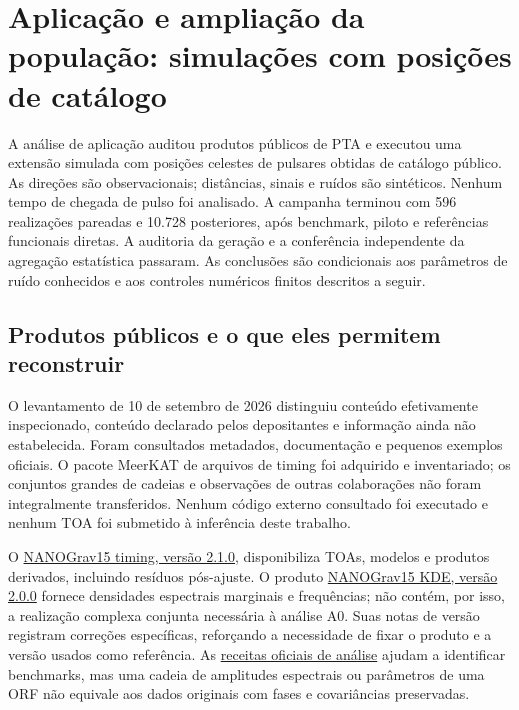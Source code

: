\chapter{Aplicação e ampliação da população: simulações com posições de catálogo}
\label{cap:c11-parcial}

A análise de aplicação auditou produtos públicos de PTA e executou uma extensão simulada com posições celestes de pulsares obtidas de catálogo público. As direções são observacionais; distâncias, sinais e ruídos são sintéticos. Nenhum tempo de chegada de pulso foi analisado. A campanha terminou com 596 realizações pareadas e 10.728 posteriores, após benchmark, piloto e referências funcionais diretas. A auditoria da geração e a conferência independente da agregação estatística passaram. As conclusões são condicionais aos parâmetros de ruído conhecidos e aos controles numéricos finitos descritos a seguir.

\section{Produtos públicos e o que eles permitem reconstruir}

O levantamento de 10 de setembro de 2026 distinguiu conteúdo efetivamente inspecionado, conteúdo declarado pelos depositantes e informação ainda não estabelecida. Foram consultados metadados, documentação e pequenos exemplos oficiais. O pacote MeerKAT de arquivos de timing foi adquirido e inventariado; os conjuntos grandes de cadeias e observações de outras colaborações não foram integralmente transferidos. Nenhum código externo consultado foi executado e nenhum TOA foi submetido à inferência deste trabalho.

O \href{https://zenodo.org/records/16051178}{NANOGrav15 timing, versão 2.1.0}, disponibiliza TOAs, modelos e produtos derivados, incluindo resíduos pós-ajuste. O produto \href{https://zenodo.org/records/21844115}{NANOGrav15 KDE, versão 2.0.0} fornece densidades espectrais marginais e frequências; não contém, por isso, a realização complexa conjunta necessária à análise A0. Suas notas de versão registram correções específicas, reforçando a necessidade de fixar o produto e a versão usados como referência. As \href{https://github.com/nanograv/15yr_stochastic_analysis/tree/a3e8b8776a646208ca2d307f83c20bc70e029933}{receitas oficiais de análise} ajudam a identificar benchmarks, mas uma cadeia de amplitudes espectrais ou parâmetros de uma ORF não equivale aos dados originais com fases e covariâncias preservadas.

